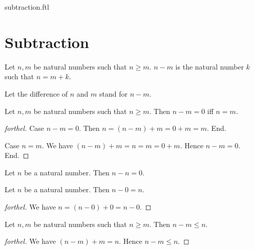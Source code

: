 \documentclass{naproche-library}
\begin{document}
\begin{smodule}{subtraction.ftl}

  \section*{Subtraction}

  \begin{definition}[forthel,id=ARITHMETIC_05_8878757276286976,printid]
    Let $n, m$ be natural numbers such that $n \geq m$.
    $n - m$ is the natural number $k$ such that $n = m + k$.

    Let the difference of $n$ and $m$ stand for $n - m$.
  \end{definition}

  \begin{proposition}[forthel,id=ARITHMETIC_05_874271710642176,printid]
    Let $n, m$ be natural numbers such that $n \geq m$.
    Then $n - m = 0$ iff $n = m$.
  \end{proposition}
  \begin{proof}[forthel]
    Case $n - m = 0$.
      Then $n
        = (n - m) + m
        = 0 + m
        = m$.
    End.

    Case $n = m$.
      We have $(n - m) + m
        = n
        = m
        = 0 + m$.
      Hence $n - m = 0$.
    End.
  \end{proof}

  \begin{corollary}[forthel,id=ARITHMETIC_05_8457713057005568,printid]
    Let $n$ be a natural number.
    Then $n - n = 0$.
  \end{corollary}

  \begin{proposition}[forthel,id=ARITHMETIC_05_8518521570983936,printid]
    Let $n$ be a natural number.
    Then $n - 0 = n$.
  \end{proposition}
  \begin{proof}[forthel]
    We have $n
      = (n - 0) + 0
      = n - 0$.
  \end{proof}

  \begin{proposition}[forthel,id=ARITHMETIC_05_4222566117933056,printid]
    Let $n, m$ be natural numbers such that $n \geq m$.
    Then $n - m \leq n$.
  \end{proposition}
  \begin{proof}[forthel]
    We have $(n - m) + m = n$.
    Hence $n - m \leq n$.
  \end{proof}


\end{smodule}
\end{document}
